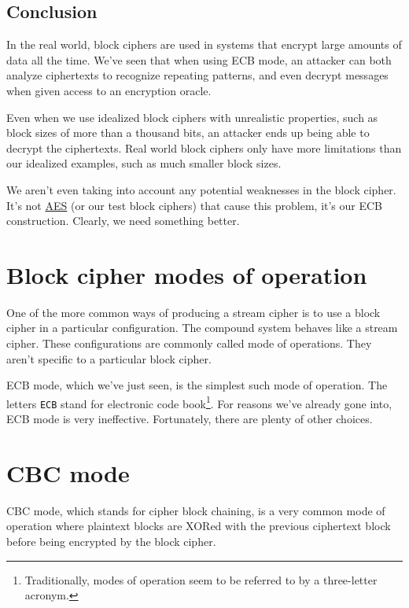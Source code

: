 \documentclass[11pt,ebook,table,dvipsnames]{memoir}
\begin{document}
\subsection{Conclusion}
\label{sec-2-3-2-4}

In the real world, block ciphers are used in systems that encrypt
large amounts of data all the time. We've seen that when using
\gls{ECB mode}, an attacker can both analyze ciphertexts to recognize
repeating patterns, and even decrypt messages when given access to an
\gls{encryption oracle}.

Even when we use idealized block ciphers with unrealistic properties,
such as block sizes of more than a thousand bits, an attacker ends up
being able to decrypt the ciphertexts. Real world block ciphers only
have more limitations than our idealized examples, such as much
smaller block sizes.

We aren't even taking into account any potential weaknesses in the
block cipher. It's not \hyperref[AES]{AES} (or our test block ciphers) that cause this
problem, it's our ECB construction. Clearly, we need something better.
\section{Block cipher modes of operation}
\label{sec-2-3-3}

One of the more common ways of producing a \gls{stream cipher} is to
use a block cipher in a particular configuration. The compound system
behaves like a stream cipher. These configurations are commonly called
\glspl{mode of operation}. They aren't specific to a particular block
cipher.

\Gls{ECB mode}, which we've just seen, is the simplest such mode of
operation. The letters \verb~ECB~ stand for electronic code book\footnote{Traditionally, modes of operation seem to be referred to by a
three-letter acronym.}. For reasons we've already gone into, ECB mode
is very ineffective. Fortunately, there are plenty of other choices.
\section{\label{CBC-mode}CBC mode}
\label{sec-2-3-4}

\gls{CBC mode}, which stands for cipher block chaining, is a very
common \gls{mode of operation} where plaintext blocks are XORed with
the previous ciphertext block before being encrypted by the block
cipher.
\end{document}
